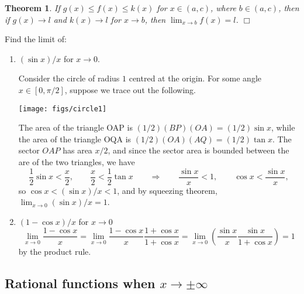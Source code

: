 \documentclass[letter-paper]{tufte-book}
\newtheorem{theorem}{\color{pastel-blue}Theorem}[section]
\newenvironment{example}[1][Example]{\begin{trivlist}
\item[\hskip \labelsep {\bfseries #1}]}{\end{trivlist}}
\newcommand{\qedwhite}{\hfill \ensuremath{\Box}}
\begin{document}
\begin{theorem}
  If $g(x)\leq f(x)\leq k(x)$ for $x\in(a,c)$, where $b\in(a,c)$, then if 
  $g(x)\to l$ and $k(x)\to l$ for $x\to b$, then $\lim_{x\to b}f(x)=l$. \qedwhite
\end{theorem}
\begin{example}
  Find the limit of:
  \begin{enumerate}
    \item $(\sin x)/x$ for $x\to 0$.
  
    Consider the circle of radius $1$ centred at the origin. For some angle 
    $x\in[0,\pi/2]$, suppose we trace out the following.
    
    \begin{marginfigure}
      \texttt{[image: figs/circle1]}
    \end{marginfigure}
    
    The area of the triangle OAP is $(1/2)(BP)(OA)=(1/2)\sin x$, while the area 
    of the triangle OQA is $(1/2)(OA)(AQ)=(1/2)\tan x$. The sector $OAP$ has 
    area $x/2$, and since the sector area is bounded between the are of the two 
    triangles, we have
    \begin{equation*}
      \frac{1}{2}\sin x<\frac{x}{2},\qquad \frac{x}{2}<\frac{1}{2}\tan x\qquad
      \Rightarrow \qquad
      \frac{\sin x}{x}<1,\qquad \cos x<\frac{\sin x}{x},
    \end{equation*}
    so $\cos x<(\sin x)/x<1$, and by squeezing theorem, $\lim_{x\to 0}(\sin x)/x 
    =1$.
    
    \item $(1-\cos x)/x$ for $x\to 0$
    \begin{equation*}
      \lim_{x\to0}\frac{1-\cos x}{x}=
      \lim_{x\to0}\frac{1-\cos x}{x}\frac{1+\cos x}{1+\cos x}
      =\lim_{x\to0}\left(\frac{\sin x}{x}\frac{\sin x}{1+\cos x}\right)
      =1
    \end{equation*}
    by the product rule.
  \end{enumerate}
\end{example}

\subsection{Rational functions when $x\to\pm\infty$}
\end{document}
